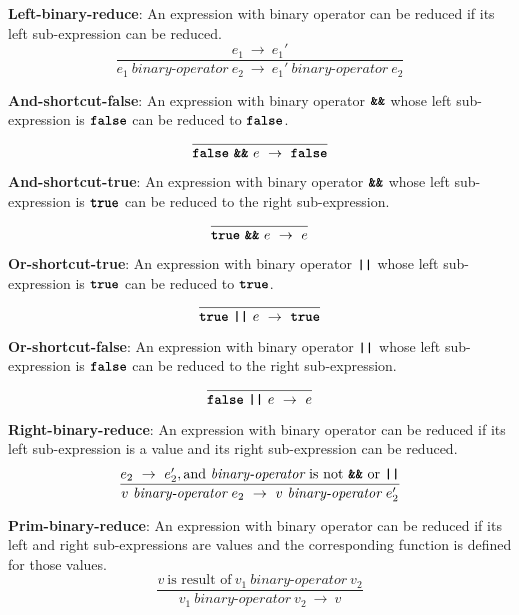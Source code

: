 \textbf{Left-binary-reduce}: An expression with binary operator
can be reduced if its left sub-expression can be reduced.
\[
\frac{
  e_1 \ \rightarrow \ e_1'
}{
  e_1\  \textit{binary-operator} \ e_2
  \ \rightarrow \ 
  e_1'\  \textit{binary-operator} \ e_2
}
\]


\vspace{10mm}
\textbf{And-shortcut-false}: An expression with binary operator
$\textbf{\texttt{\&\&}}$ whose left sub-expression is
$\textbf{\texttt{false}}$ can be reduced to
$\textbf{\texttt{false}}$.
\[
\frac{
}{
  \textbf{\texttt{false}}\  \textbf{\texttt{\&\&}}\ e
  \ \rightarrow \ 
  \textbf{\texttt{false}}
}
\]

\vspace{10mm}
\textbf{And-shortcut-true}: An expression with binary operator
$\textbf{\texttt{\&\&}}$ whose left sub-expression is
$\textbf{\texttt{true}}$ can be reduced to
the right sub-expression.
\[
\frac{
}{
  \textbf{\texttt{true}}\  \textbf{\texttt{\&\&}}\ e
  \ \rightarrow \ 
  e
}
\]

\vspace{10mm}
\textbf{Or-shortcut-true}: An expression with binary operator
$\textbf{\texttt{||}}$ whose left sub-expression is
$\textbf{\texttt{true}}$ can be reduced to
$\textbf{\texttt{true}}$.
\[
\frac{
}{
  \textbf{\texttt{true}}\  \textbf{\texttt{||}}\ e
  \ \rightarrow \ 
  \textbf{\texttt{true}}
}
\]

\vspace{10mm}
\textbf{Or-shortcut-false}: An expression with binary operator
$\textbf{\texttt{||}}$ whose left sub-expression is
$\textbf{\texttt{false}}$ can be reduced to
the right sub-expression.
\[
\frac{
}{
  \textbf{\texttt{false}}\  \textbf{\texttt{||}}\ e
  \ \rightarrow \ 
  e
}
\]

\vspace{10mm}
\textbf{Right-binary-reduce}: An expression with binary operator
can be reduced if its left sub-expression is a value and its right
sub-expression can be reduced.
\[
\frac{
  e_2\ \rightarrow\ e_2', \textrm{and}\ \textit{binary-operator}
  \ \mbox{is not}\ \textbf{\texttt{\&\&}}\ \textrm{or}\ \texttt{\textbf{||}}
}{
  v\  \textit{binary-operator} \ e_2
  \ \rightarrow \ 
  v\  \textit{binary-operator} \ e_2'
}
\]

\vspace{10mm}
\textbf{Prim-binary-reduce}: An expression with binary operator
can be reduced if its left and right sub-expressions are values and
the corresponding function is defined for those values.
\[
\frac{
  v\ \mbox{is result of}\ v_1\  \textit{binary-operator} \ v_2
}{
  v_1\  \textit{binary-operator} \ v_2
  \ \rightarrow \ 
  v
}
\]

